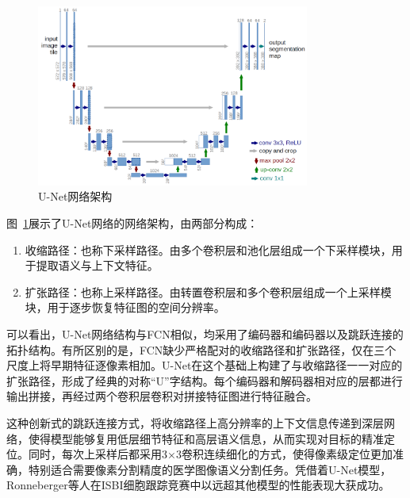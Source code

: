 \begin{figure}[htbp]
    \centering
    \includegraphics[width=0.8\textwidth]{fig/u-net-architecture.png}
    \caption{U-Net网络架构\cite{ronneberger2015}}
    \label{fig:unet_frame}
\end{figure}

图~\ref{fig:unet_frame}展示了U-Net网络的网络架构，由两部分构成：

\begin{enumerate}
    \item 收缩路径：也称下采样路径。由多个卷积层和池化层组成一个下采样模块，用于提取语义与上下文特征。
    \item 扩张路径：也称上采样路径。由转置卷积层和多个卷积层组成一个上采样模块，用于逐步恢复特征图的空间分辨率。
\end{enumerate}

可以看出，U-Net网络结构与FCN相似，均采用了编码器和编码器以及跳跃连接的拓扑结构。有所区别的是，FCN缺少严格配对的收缩路径和扩张路径，仅在三个尺度上将早期特征逐像素相加。U-Net在这个基础上构建了与收缩路径一一对应的扩张路径，形成了经典的对称“U”字结构。每个编码器和解码器相对应的层都进行输出拼接，再经过两个卷积层卷积对拼接特征图进行特征融合。

这种创新式的跳跃连接方式，将收缩路径上高分辨率的上下文信息传递到深层网络，使得模型能够复用低层细节特征和高层语义信息，从而实现对目标的精准定位。同时，每次上采样后都采用3×3卷积连续细化的方式，使得像素级定位更加准确，特别适合需要像素分割精度的医学图像语义分割任务。凭借着U-Net模型，Ronneberger等人在ISBI细胞跟踪竞赛中以远超其他模型的性能表现大获成功\cite{ronneberger2015}。